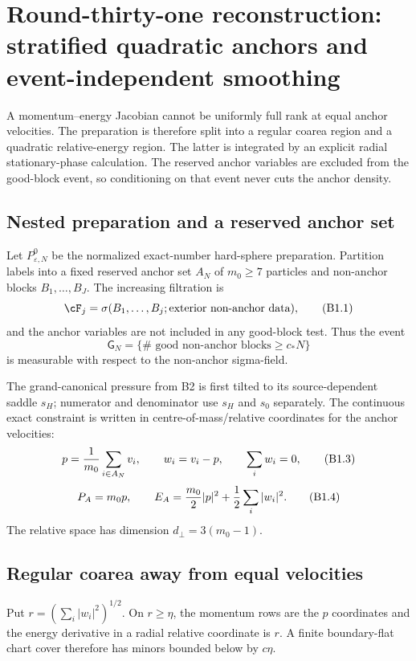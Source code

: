 \section{Round-thirty-one reconstruction: stratified quadratic anchors and event-independent smoothing}
\label{sec:r31-b1}

A momentum--energy Jacobian cannot be uniformly full rank at equal anchor
velocities.  The preparation is therefore split into a regular coarea region
and a quadratic relative-energy region.  The latter is integrated by an
explicit radial stationary-phase calculation.  The reserved anchor variables
are excluded from the good-block event, so conditioning on that event never
cuts the anchor density.

\subsection{Nested preparation and a reserved anchor set}

Let $P^0_{\varepsilon,N}$ be the normalized exact-number hard-sphere
preparation.  Partition labels into a fixed reserved anchor set $A_N$ of
$m_0\ge7$ particles and non-anchor blocks $B_1,\ldots,B_J$.  The increasing
filtration is
\[
 \cF_j=\sigma(B_1,\ldots,B_j;\text{exterior non-anchor data}),           \tag{B1.1}
\]
and the anchor variables are not included in any good-block test.  Thus the
event
\[
 \mathsf G_N=\{\#\text{ good non-anchor blocks}\ge c_*N\}                \tag{B1.2}
\]
is measurable with respect to the non-anchor sigma-field.

The grand-canonical pressure from B2 is first tilted to its source-dependent
saddle $s_H$; numerator and denominator use $s_H$ and $s_0$ separately.
The continuous exact constraint is written in centre-of-mass/relative
coordinates for the anchor velocities:
\[
 p={1\over m_0}\sum_{i\in A_N}v_i,\qquad
 w_i=v_i-p,\qquad\sum_iw_i=0,                              \tag{B1.3}
\]
\[
 P_A=m_0p,\qquad
 E_A={m_0\over2}|p|^2+{1\over2}\sum_i|w_i|^2.             \tag{B1.4}
\]
The relative space has dimension $d_\perp=3(m_0-1)$.

\subsection{Regular coarea away from equal velocities}

Put $r=(\sum_i|w_i|^2)^{1/2}$.  On $r\ge\eta$, the momentum rows are the
$p$ coordinates and the energy derivative in a radial relative coordinate is
$r$.  A finite boundary-flat chart cover therefore has minors bounded below
by $c\eta$.

